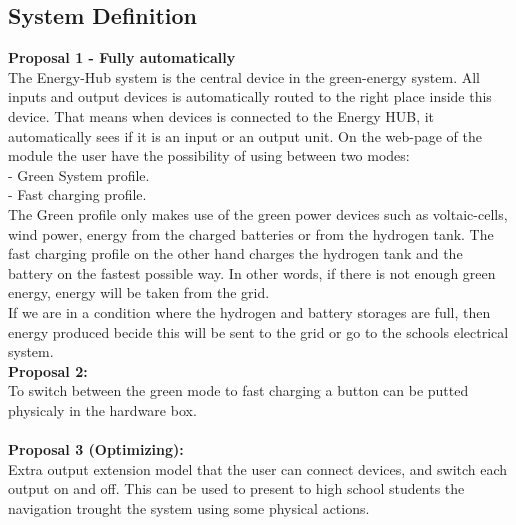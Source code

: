 \subsection{System Definition}
\textbf{Proposal 1 - Fully automatically}\\
The Energy-Hub system is the central device in the green-energy system. All
inputs and output devices is automatically routed to the right place inside this
device. That means when devices is connected to the Energy HUB, it automatically
sees if it is an input or an output unit. On the web-page of the module the user
have the possibility of using between two modes:
\\ - Green System profile.
\\ - Fast charging profile.
\\The Green profile only makes use of the green power devices such as
voltaic-cells, wind power, energy from the charged batteries or from the
hydrogen tank. 
The fast charging profile on the other hand charges the hydrogen tank and the
battery on the fastest possible way. In other words, if there is not enough
green energy, energy will be taken from the grid.
\\If we are in a condition where the hydrogen and battery storages are full,
then energy produced becide this will be sent to the grid or go to the schools
electrical system.
\\\textbf{Proposal 2:}\\
To switch between the green mode to fast charging a button can be putted
physicaly in the hardware box.\\
\\\textbf{Proposal 3 (Optimizing):}\\
Extra output extension model that the user can connect devices, and switch
each output on and off. This can be used to present to high school students
the navigation trought the system using some physical actions.